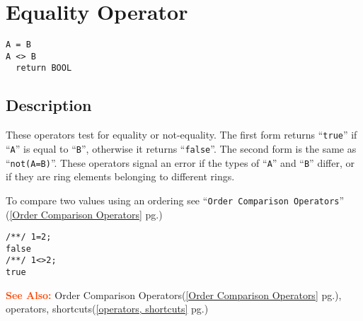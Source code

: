 \documentclass[a4paper]{mybook}
\newenvironment{command}{}{} %
\newcommand\SeeAlso{\par\textcolor{OrangeRed}{\textbf{\large See Also: }}}
\begin{document}
\section{Equality Operator}
\label{Equality Operator}
\begin{command} %


\begin{Verbatim}[label=syntax, rulecolor=\color{MidnightBlue},
frame=single]
A = B
A <> B
  return BOOL
\end{Verbatim}


\subsection*{Description}

These operators test for equality or not-equality.  The first form
returns ``\verb&true&'' if ``\verb&A&'' is equal to ``\verb&B&'', otherwise it returns ``\verb&false&''.
The second form is the same as ``\verb&not(A=B)&''.  These operators signal an
error if the types of ``\verb&A&'' and ``\verb&B&'' differ, or if they are ring elements
belonging to different rings.
\par 
To compare two values using an ordering see ``\verb&Order Comparison Operators&'' (\ref{Order Comparison Operators} pg.\pageref{Order Comparison Operators})
\begin{Verbatim}[label=example, rulecolor=\color{PineGreen}, frame=single]
/**/ 1=2;
false
/**/ 1<>2;
true
\end{Verbatim}


\SeeAlso %
  Order Comparison Operators(\ref{Order Comparison Operators} pg.\pageref{Order Comparison Operators}), 
    operators, shortcuts(\ref{operators, shortcuts} pg.\pageref{operators, shortcuts})
\end{command} %
\end{document}
